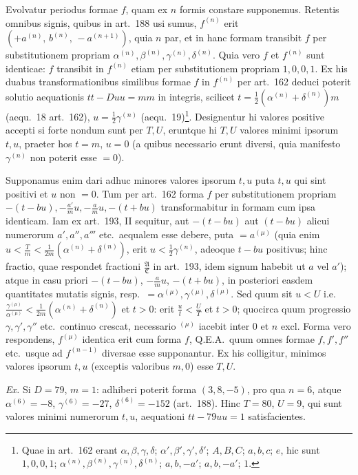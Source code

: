 \documentclass[12pt,a4paper]{article}
\theoremstyle{plain}
\theoremstyle{definition}
\theoremstyle{remark}
\newcommand{\qeoa}{\textsc{Q.E.A.}}
\begin{document}
Evolvatur periodus formae $f$, quam ex $n$ formis constare supponemus. Retentis omnibus signis, quibus in art.\ 188 usi sumus, $f^{(n)}$ erit $(+a^{(n)},\, b^{(n)},\, -a^{(n+1)})$, quia $n$ par, et in hanc formam transibit $f$ per substitutionem propriam $\alpha^{(n)},\beta^{(n)},\gamma^{(n)},\delta^{(n)}$. Quia vero $f$ et $f^{(n)}$ sunt identicae: $f$ transibit in $f^{(n)}$ etiam per substitutionem propriam $1,0,0,1$. Ex his duabus transformationibus similibus formae $f$ in $f^{(n)}$ per art.\ 162 deduci poterit solutio aequationis $tt-Duu=mm$ in integris, scilicet $t=\frac{1}{2}(\alpha^{(n)}+\delta^{(n)})m$ (aequ.\ 18 art.\ 162), $u=\frac{1}{2}\gamma^{(n)}$ (aequ.\ 19)\footnote{Quae in art.\ 162 erant $\alpha,\beta,\gamma,\delta$; $\alpha',\beta',\gamma',\delta'$; $A,B,C$; $a,b,c$; $e$, hic sunt $1,0,0,1$; $\alpha^{(n)},\beta^{(n)},\gamma^{(n)},\delta^{(n)}$; $a,b,-a'$; $a,b,-a'$; $1$.}. Designentur hi valores positive accepti si forte nondum sunt per $T,U$, eruntque hi $T,U$ valores minimi ipsorum $t,u$, praeter hos $t=m$, $u=0$ (a quibus necessario erunt diversi, quia manifesto $\gamma^{(n)}$ non poterit esse $=0$).

Supponamus enim dari adhuc minores valores ipsorum $t,u$ puta $t,u$ qui sint positivi et $u$ non $=0$. Tum per art.\ 162 forma $f$ per substitutionem propriam $-(t-bu),-\frac{a'}{m}u,-\frac{a}{m}u,-(t+bu)$ transformabitur in formam cum ipsa identicam. Iam ex art.\ 193, II sequitur, aut $-(t-bu)$ aut $(t-bu)$ alicui numerorum $a',a'',a'''$ etc.\ aequalem esse debere, puta $=a^{(\mu)}$ (quia enim $u<\frac{T}{m}<\frac{1}{2m}(\alpha^{(n)}+\delta^{(n)})$, erit $u<\frac{1}{2}\gamma^{(n)}$, adeoque $t-bu$ positivus; hinc fractio, quae respondet fractioni $\frac{\mathfrak{A}}{\mathfrak{C}}$ in art.\ 193, idem signum habebit ut $a$ vel $a'$); atque in casu priori $-(t-bu)$, $-\frac{a}{m}u$, $-(t+bu)$, in posteriori easdem quantitates mutatis signis, resp.\ $=\alpha^{(\mu)},\gamma^{(\mu)},\delta^{(\mu)}$. Sed quum sit $u<U$ i.e.\ $\frac{\gamma^{(\mu)}}{\alpha^{(\mu)}}<\frac{1}{2m}(\alpha^{(n)}+\delta^{(n)})$ et $t>0$: erit $\frac{u}{t}<\frac{U}{T}$ et $t>0$; quocirca quum progressio $\gamma,\gamma',\gamma''$ etc.\ continuo crescat, necessario $^{(\mu)}$ iacebit inter $0$ et $n$ excl. Forma vero respondens, $f^{(\mu)}$ identica erit cum forma $f$, \qeoa\, quum omnes formae $f,f',f''$ etc.\ usque ad $f^{(n-1)}$ diversae esse supponantur. Ex his colligitur, minimos valores ipsorum $t,u$ (exceptis valoribus $m,0$) esse $T,U$.

\textit{Ex.} Si $D=79$, $m=1$: adhiberi poterit forma $(3,8,-5)$, pro qua $n=6$, atque $\alpha^{(6)}=-8$, $\gamma^{(6)}=-27$, $\delta^{(6)}=-152$ (art.\ 188). Hinc $T=80$, $U=9$, qui sunt valores minimi numerorum $t,u$, aequationi $tt-79uu=1$ satisfacientes.
\end{document}

